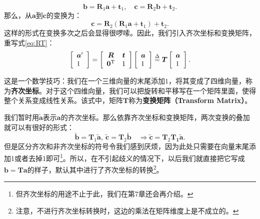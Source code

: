 \[
\bm{b} = {\bm{R}_1} \bm{a} + {\bm{t}_1}, \quad \bm{c} = {\bm{R}_2} \bm{b} + {\bm{t}_2}.
\]
那么，从$\bm{a}$到$\bm{c}$的变换为：
\[
\bm{c} = {\bm{R}_2}\left( {{\bm{R}_1} \bm{a} + {\bm{t}_1}} \right) + {\bm{t}_2}.
\]
这样的形式在变换多次之后会显得很啰嗦。因此，我们引入齐次坐标和变换矩阵，重写式\eqref{eq:RT}：
\begin{equation}
\left[ \begin{array}{l}
\bm{a}'\\
1
\end{array} \right] = 
\left[ {\begin{array}{*{20}{c}}
	\bm{R}&\bm{t}\\
	{{\bm{0}^\mathrm{T}}}&1
	\end{array}} \right]
\left[ \begin{array}{l}
\bm{a}\\
1
\end{array} \right]  \buildrel \Delta \over = \bm{T} \left[ \begin{array}{l}
\bm{a}\\
1
\end{array} \right].
\end{equation}

这是一个数学技巧：我们在一个三维向量的末尾添加$1$，将其变成了四维向量，称为\textbf{齐次坐标}。对于这个四维向量，我们可以把旋转和平移写在一个矩阵里面，使得整个关系变成线性关系。该式中，矩阵$\bm{T}$称为\textbf{变换矩阵（Transform Matrix）}。
%
%

我们暂时用$ \tilde{ \bm{a} }$表示$\bm{a}$的齐次坐标。那么依靠齐次坐标和变换矩阵，两次变换的叠加就可以有很好的形式：
\begin{equation}
	\tilde{\bm{b}} = \bm{T}_1 \tilde{\bm{a}}, \  \tilde{\bm{c}} = \bm{T}_2 \tilde{\bm{b}} \quad \Rightarrow \tilde{\bm{c}} = \bm{T}_2 \bm{T_1} \tilde{\bm{a}}.
\end{equation}
但是区分齐次和非齐次坐标的符号令我们感到厌烦，因为此处只需要在向量末尾添加1或者去掉1即可\footnote{但齐次坐标的用途不止于此，我们在第7章还会再介绍。}。所以，在不引起歧义的情况下，以后我们就直接把它写成$\bm{b}= \bm{T} \bm{a}$的样子，默认其中进行了齐次坐标的转换\footnote{注意，不进行齐次坐标转换时，这边的乘法在矩阵维度上是不成立的。}。

